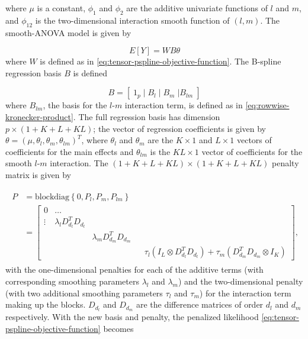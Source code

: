 \documentclass[12pt]{article}
\newcommand{\ms}{\scriptscriptstyle}
\theoremstyle{definition}
\begin{document}
where $\mu$ is a constant, $\phi_1$ and $\phi_2$ are the additive univariate functions of $l$ and $m$, and $\phi_{12}$ is the two-dimensional interaction smooth function of $\left(l,m\right)$. The smooth-ANOVA model is given by

\begin{equation} \label{eq:SANOVA}
E\left[ Y \right] = W  B \theta
\end{equation}
\noindent
where $W$ is defined as in \ref{eq:tensor-pspline-objective-function}. The B-spline regression basis $B$ is defined 

\begin{equation} \label{eq:SANOVA-basis-matrix}
B = \left[\; 1_p \; \vert \;  B_l  \; \vert \;   B_m \; \vert B_{lm} \; \right]
\end{equation}
\noindent
where $B_{lm}$, the basis for the $l$-$m$ interaction term, is defined as in \ref{eq:rowwise-kronecker-product}. The full regression basis has dimension $p \times \left( 1 + K + L + KL \right)$; the vector of regression coefficients is given by $\theta = \left(\mu, \theta_l, \theta_m, \theta_{lm}\right)^T$, where $\theta_l$ and $\theta_m$ are the $K \times 1$ and $L \times 1$ vectors of coefficients for the main effects and $\theta_{lm}$ is the $KL \times 1$ vector of coefficients for the smooth $l$-$m$ interaction. The $\left(1 + K + L + KL\right) \times \left(1 + K + L + KL\right)$ penalty matrix is given by 

\begin{align}
\begin{split} \label{eq:PSANOVA-penalty}
P &= \mbox{blockdiag}\left\{0, P_l, P_m, P_{lm}\right\}\\ 
&= \begin{bmatrix}
0 	 & \dots 		      &    			 	& \\
\vdots &  \lambda_l D_{d_{\ms l}}^T D_{d_{\ms l}} &				 	& \\
&   	 			      &  \lambda_m D_{d_{\ms m}}^T D_{d_{\ms m}} 	& \\
&	 &			      &					&  \tau_l \left(I_L \otimes D_{d_{\ms l}}^T D_{d_{\ms l}}\right) + \tau_m \left(D_{d_{\ms m}}^T D_{d_{\ms m}} \otimes I_K \right)			
\end{bmatrix},
\end{split}
\end{align}
\noindent
with the one-dimensional penalties for each of the additive terms (with corresponding smoothing parameters $\lambda_l$ and $\lambda_m$) and the two-dimensional penalty (with two additional smoothing parameters $\tau_l$ and $\tau_m$) for the interaction term making up the blocks. $D_{d_{\ms l}}$ and $D_{d_{\ms m}}$ are the difference matrices of order $d_{\ms l}$ and $d_{\ms m}$ respectively. With the new basis and penalty, the penalized likelihood \ref{eq:tensor-pspline-objective-function} becomes
\end{document}
